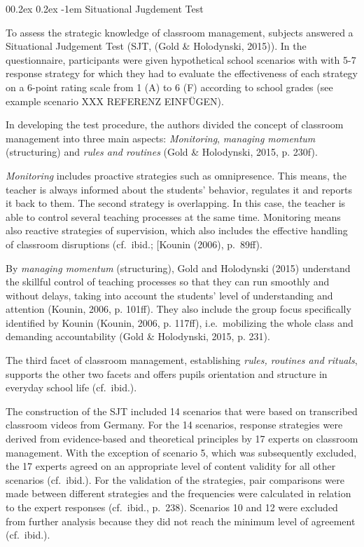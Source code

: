 \documentclass[
  man]{apa6}
\makeatletter
\let\oldparagraph\paragraph
\renewcommand{\paragraph}[1]{\oldparagraph{#1}\mbox{}}
\renewcommand{\paragraph}{\@startsection{paragraph}{4}{\parindent}%
  {0\baselineskip \@plus 0.2ex \@minus 0.2ex}%
  {-1em}%
  {\normalfont\normalsize\bfseries\itshape\typesectitle}}
\makeatother
\begin{document}
\hypertarget{situational-jugdement-test}{%
\paragraph{Situational Jugdement Test}\label{situational-jugdement-test}}

To assess the strategic knowledge of classroom management, subjects answered a Situational Judgement Test (SJT, (Gold \& Holodynski, 2015)). In the questionnaire, participants were given hypothetical school scenarios with with 5-7 response strategy for which they had to evaluate the effectiveness of each strategy on a 6-point rating scale from 1 (A) to 6 (F) according to school grades (see example scenario XXX REFERENZ EINFÜGEN).

In developing the test procedure, the authors divided the concept of classroom management into three main aspects: \emph{Monitoring}, \emph{managing momentum} (structuring) and \emph{rules and routines} (Gold \& Holodynski, 2015, p. 230f).

\emph{Monitoring} includes proactive strategies such as omnipresence. This means, the teacher is always informed about the students' behavior, regulates it and reports it back to them. The second strategy is overlapping. In this case, the teacher is able to control several teaching processes at the same time. Monitoring means also reactive strategies of supervision, which also includes the effective handling of classroom disruptions (cf.~ibid.; {[}Kounin (2006), p.~89ff).

By \emph{managing momentum} (structuring), Gold and Holodynski (2015) understand the skillful control of teaching processes so that they can run smoothly and without delays, taking into account the students' level of understanding and attention (Kounin, 2006, p. 101ff). They also include the group focus specifically identified by Kounin (Kounin, 2006, p. 117ff), i.e.~mobilizing the whole class and demanding accountability (Gold \& Holodynski, 2015, p. 231).

The third facet of classroom management, establishing \emph{rules, routines and rituals}, supports the other two facets and offers pupils orientation and structure in everyday school life (cf.~ibid.).

The construction of the SJT included 14 scenarios that were based on transcribed classroom videos from Germany. For the 14 scenarios, response strategies were derived from evidence-based and theoretical principles by 17 experts on classroom management. With the exception of scenario 5, which was subsequently excluded, the 17 experts agreed on an appropriate level of content validity for all other scenarios (cf.~ibid.). For the validation of the strategies, pair comparisons were made between different strategies and the frequencies were calculated in relation to the expert responses (cf.~ibid., p.~238). Scenarios 10 and 12 were excluded from further analysis because they did not reach the minimum level of agreement (cf.~ibid.).
\end{document}

